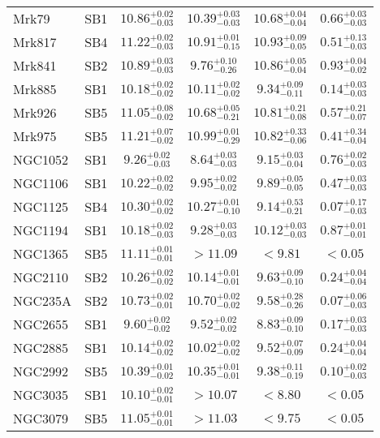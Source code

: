 \documentclass[onecolumn]{mn2e}
\begin{document}
{\begin{center}
\begin{longtable}{lccccc}
Mrk79 & SB1 & $10.86_{-0.03}^{+0.02}$ & $10.39_{-0.03}^{+0.03}$ & $10.68_{-0.04}^{+0.04}$ &$0.66_{-0.03}^{+0.03}$ \\
Mrk817 & SB4 & $11.22_{-0.03}^{+0.02}$ & $10.91_{-0.15}^{+0.01}$ & $10.93_{-0.05}^{+0.09}$ &$0.51_{-0.03}^{+0.13}$ \\
Mrk841 & SB2 & $10.89_{-0.03}^{+0.03}$ & $9.76_{-0.26}^{+0.10}$ & $10.86_{-0.04}^{+0.05}$ &$0.93_{-0.02}^{+0.04}$ \\
Mrk885 & SB1 & $10.18_{-0.02}^{+0.02}$ & $10.11_{-0.02}^{+0.02}$ & $9.34_{-0.11}^{+0.09}$ &$0.14_{-0.03}^{+0.03}$ \\
Mrk926 & SB5 & $11.05_{-0.02}^{+0.08}$ & $10.68_{-0.21}^{+0.05}$ & $10.81_{-0.08}^{+0.21}$ &$0.57_{-0.07}^{+0.21}$ \\
Mrk975 & SB5 & $11.21_{-0.02}^{+0.07}$ & $10.99_{-0.29}^{+0.01}$ & $10.82_{-0.06}^{+0.33}$ &$0.41_{-0.04}^{+0.34}$ \\
NGC1052 & SB1 & $9.26_{-0.03}^{+0.02}$ & $8.64_{-0.03}^{+0.03}$ & $9.15_{-0.04}^{+0.03}$ &$0.76_{-0.03}^{+0.02}$ \\
NGC1106 & SB1 & $10.22_{-0.02}^{+0.02}$ & $9.95_{-0.02}^{+0.02}$ & $9.89_{-0.05}^{+0.05}$ &$0.47_{-0.03}^{+0.03}$ \\
NGC1125 & SB4 & $10.30_{-0.02}^{+0.02}$ & $10.27_{-0.10}^{+0.01}$ & $9.14_{-0.21}^{+0.53}$ &$0.07_{-0.03}^{+0.17}$ \\
NGC1194 & SB1 & $10.18_{-0.03}^{+0.02}$ & $9.28_{-0.03}^{+0.03}$ & $10.12_{-0.03}^{+0.03}$ &$0.87_{-0.01}^{+0.01}$ \\
NGC1365 & SB5 & $11.11_{-0.01}^{+0.01}$ & $>11.09$ & $<9.81$ &$<0.05$ \\
NGC2110 & SB2 & $10.26_{-0.02}^{+0.02}$ & $10.14_{-0.01}^{+0.01}$ & $9.63_{-0.10}^{+0.09}$ &$0.24_{-0.04}^{+0.04}$ \\
NGC235A & SB2 & $10.73_{-0.01}^{+0.02}$ & $10.70_{-0.02}^{+0.02}$ & $9.58_{-0.26}^{+0.28}$ &$0.07_{-0.03}^{+0.06}$ \\
NGC2655 & SB1 & $9.60_{-0.02}^{+0.02}$ & $9.52_{-0.02}^{+0.02}$ & $8.83_{-0.10}^{+0.09}$ &$0.17_{-0.03}^{+0.03}$ \\
NGC2885 & SB1 & $10.14_{-0.02}^{+0.02}$ & $10.02_{-0.02}^{+0.02}$ & $9.52_{-0.09}^{+0.07}$ &$0.24_{-0.04}^{+0.04}$ \\
NGC2992 & SB5 & $10.39_{-0.02}^{+0.01}$ & $10.35_{-0.01}^{+0.01}$ & $9.38_{-0.19}^{+0.11}$ &$0.10_{-0.03}^{+0.02}$ \\
NGC3035 & SB1 & $10.10_{-0.01}^{+0.02}$ & $>10.07$ & $<8.80$ &$<0.05$ \\
NGC3079 & SB5 & $11.05_{-0.01}^{+0.01}$ & $>11.03$ & $<9.75$ &$<0.05$ \\

\end{longtable}
\end{center}}
\end{document}

